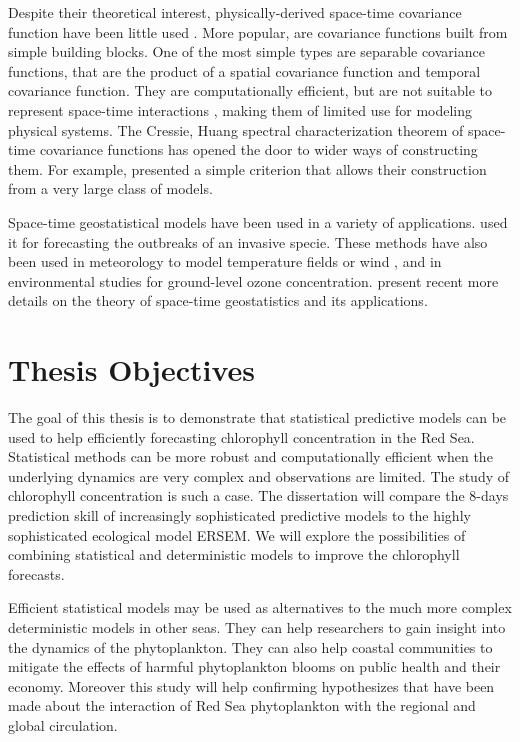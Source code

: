 Despite their theoretical interest, physically-derived space-time covariance 
function have been little used \citep{Gneiting2010}. More popular, are 
covariance functions built from simple building blocks. One of the most simple 
types are separable covariance functions, that are the product of a spatial 
covariance function and temporal covariance function. They are computationally 
efficient, but are not suitable to represent space-time interactions 
\citep{Cressie1999, Stein2005}, making them of limited use for modeling physical 
systems. The Cressie, Huang spectral characterization theorem of space-time 
covariance functions has opened the door to wider ways of constructing them. For 
example, \citet{Gneiting2002} presented a simple criterion that allows their 
construction from a very large class of models. 

Space-time geostatistical models have been used in a variety of applications. 
\citet{Hohn1993} used it for forecasting the outbreaks of an invasive specie. 
These methods have also been used in meteorology to model temperature fields 
\citep{Handcock1994, North2011} or wind \citep{Cressie1999, Gneiting2002}, and 
in environmental studies for ground-level ozone concentration. 
\citet{Gneiting2007, Gneiting2010} present recent more details on the theory of 
space-time geostatistics and its applications.

\section{Thesis Objectives}



The goal of this thesis is to demonstrate that statistical predictive models can 
be used to help efficiently forecasting chlorophyll concentration in the Red 
Sea. Statistical methods can be more robust and computationally efficient when 
the underlying dynamics are very complex and observations are limited. The study 
of chlorophyll concentration is such a case. The dissertation will compare the 
8-days prediction skill of increasingly sophisticated predictive models to the 
highly sophisticated ecological model ERSEM. We will explore the possibilities 
of combining statistical and deterministic models to improve the chlorophyll 
forecasts.

Efficient statistical models may be used as alternatives to the much more 
complex deterministic models in other seas. They can help researchers to gain 
insight into the dynamics of the phytoplankton. They can also help coastal 
communities to mitigate the effects of harmful phytoplankton blooms on public 
health and their economy. Moreover this study will help confirming hypothesizes 
that have been made about the interaction of Red Sea phytoplankton with the 
regional and global circulation. 

